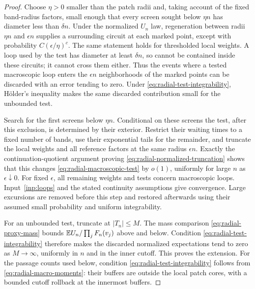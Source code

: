 \begin{proof}
Choose $\eta>0$ smaller than the patch radii and, taking account of
the fixed band-radius factors, small enough that every screen sought
below $\eta n$ has diameter less than $\delta n$.
Under the normalized $U_n$ law, regeneration between radii
$\eta n$ and $\epsilon n$ supplies a surrounding circuit at each
marked point, except with probability $C(\epsilon/\eta)^c$.
The same statement holds for thresholded local weights. A loop
used by the test has diameter at least $\delta n$, so cannot be
contained inside these circuits; it cannot cross them either.
Thus the events where a tested macroscopic loop enters the
$\epsilon n$ neighborhoods of the marked points can be discarded
with an error tending to zero. Under
\eqref{eq:radial-test-integrability}, H\"older's inequality makes
the same discarded contribution small for the unbounded test.

Search for the first screens below $\eta n$. Conditional on these
screens the test, after this exclusion, is determined by their
exterior. Restrict their waiting times to a fixed number of bands,
use their exponential tails for the remainder, and truncate the
local weights and all reference factors at the same radius
$\epsilon n$. Exactly the continuation-quotient argument proving
\eqref{eq:radial-normalized-truncation} shows that this changes
\eqref{eq:radial-macroscopic-test} by $o(1)$, uniformly for large
$n$ as $\epsilon\downarrow0$. For fixed $\epsilon$, all remaining
weights and tests concern macroscopic loops. Input~\ref{inp:loops}
and the stated continuity assumptions give convergence. Large
excursions are removed before this step and restored afterwards
using their assumed small probability and uniform integrability.

For an unbounded test, truncate at $|T_n|\le M$. The mass comparison
\eqref{eq:radial-proxy-mass} bounds
$\mathbb E U_n/\prod_jF_n(v_j)$ above and below. Condition
\eqref{eq:radial-test-integrability} therefore makes the discarded
normalized expectations tend to zero as $M\to\infty$, uniformly
in $n$ and in the inner cutoff. This proves the extension.
For the passage counts used below, condition
\eqref{eq:radial-test-integrability} follows from
\eqref{eq:radial-macro-moments}: their buffers are outside the local
patch cores, with a bounded cutoff rollback at the innermost buffers.
\end{proof}
